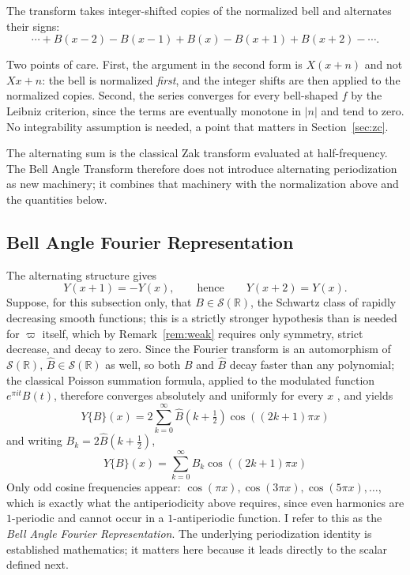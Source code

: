 \documentclass[11pt]{article}
\theoremstyle{definition}
\theoremstyle{plain}
\theoremstyle{remark}
\begin{document}
The transform takes integer-shifted copies of the normalized bell and alternates their
signs:
\[
\cdots+B(x-2)-B(x-1)+B(x)-B(x+1)+B(x+2)-\cdots.
\]

Two points of care. First, the argument in the second form is $X(x+n)$ and not $Xx+n$:
the bell is normalized \emph{first}, and the integer shifts are then applied to the
normalized copies. Second, the series converges for every bell-shaped $f$ by the Leibniz
criterion, since the terms are eventually monotone in $|n|$ and tend to zero. No
integrability assumption is needed, a point that matters in
Section~\ref{sec:zc}.

The alternating sum is the classical Zak transform evaluated at half-frequency. The Bell
Angle Transform therefore does not introduce alternating periodization as new machinery;
it combines that machinery with the normalization above and the quantities below.

\subsection{Bell Angle Fourier Representation}

The alternating structure gives
\[
Y(x+1)=-Y(x),\qquad\text{hence}\qquad Y(x+2)=Y(x).
\]
Suppose, for this subsection only, that $B\in\mathcal S(\mathbb R)$, the Schwartz class
of rapidly decreasing smooth functions; this is a strictly stronger hypothesis than is
needed for $\varpi$ itself, which by Remark~\ref{rem:weak} requires only symmetry,
strict decrease, and decay to zero. Since the Fourier transform is an automorphism of
$\mathcal S(\mathbb R)$, $\widehat B\in\mathcal S(\mathbb R)$ as well, so both $B$ and
$\widehat B$ decay faster than any polynomial; the classical Poisson summation formula,
applied to the modulated function $e^{\pi it}B(t)$, therefore converges absolutely and
uniformly for every $x$ \cite{Grochenig2001}, and yields
\[
\boxed{\;Y\{B\}(x)=2\sum_{k=0}^{\infty}\widehat{B}\!\left(k+\tfrac12\right)
\cos\!\left((2k+1)\pi x\right)\;}
\]
and writing $B_k=2\widehat{B}\!\left(k+\tfrac12\right)$,
\[
\boxed{\;Y\{B\}(x)=\sum_{k=0}^{\infty}B_k\cos\!\left((2k+1)\pi x\right)\;}
\]
Only odd cosine frequencies appear: $\cos(\pi x),\cos(3\pi x),\cos(5\pi x),\dots$, which
is exactly what the antiperiodicity above requires, since even harmonics are $1$-periodic
and cannot occur in a $1$-antiperiodic function. I refer to this as the \emph{Bell Angle
Fourier Representation}. The underlying periodization identity is established
mathematics; it matters here because it leads directly to the scalar defined next.
\end{document}
